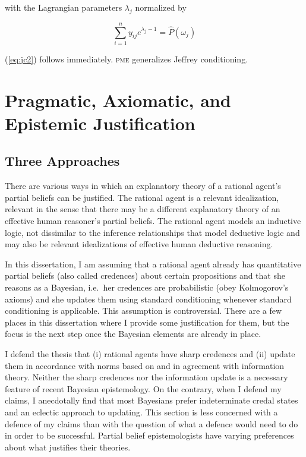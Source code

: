 \documentclass[phd,12pt,oneside]{ubcthesis}
\begin{document}
{\noindent}with the Lagrangian parameters $\lambda_{j}$ normalized by

\begin{equation}
  \label{eq:jc5}
  \sum_{i=1}^{n}y_{ij}e^{\lambda_{j}-1}=\hat{P}(\omega_{j})
\end{equation}

{\noindent}(\ref{eq:jc2}) follows immediately. \textsc{pme}
generalizes Jeffrey conditioning.

\section{Pragmatic, Axiomatic, and Epistemic Justification}
\label{sec:vichaina}

\subsection{Three Approaches}
\label{subsec:eiphethe}

There are various ways in which an explanatory theory of a rational
agent's partial beliefs can be justified. The rational agent is a
relevant idealization, relevant in the sense that there may be a
different explanatory theory of an effective human reasoner's partial
beliefs. The rational agent models an inductive logic, not dissimilar
to the inference relationships that model deductive logic and may also
be relevant idealizations of effective human deductive reasoning.

In this dissertation, I am assuming that a rational agent already has
quantitative partial beliefs (also called credences) about certain
propositions and that she reasons as a Bayesian, i.e.\ her credences
are probabilistic (obey Kolmogorov's axioms) and she updates them
using standard conditioning whenever standard conditioning is
applicable. This assumption is controversial. There are a few places
in this dissertation where I provide some justification for them, but
the focus is the next step once the Bayesian elements are already in
place. 

I defend the thesis that (i) rational agents have sharp credences and
(ii) update them in accordance with norms based on and in agreement
with information theory. Neither the sharp credences nor the
information update is a necessary feature of recent Bayesian
epistemology. On the contrary, when I defend my claims, I anecdotally
find that most Bayesians prefer indeterminate credal states and an
eclectic approach to updating. This section is less concerned with a
defence of my claims than with the question of what a defence would
need to do in order to be successful. Partial belief epistemologists
have varying preferences about what justifies their theories. 
\end{document}
